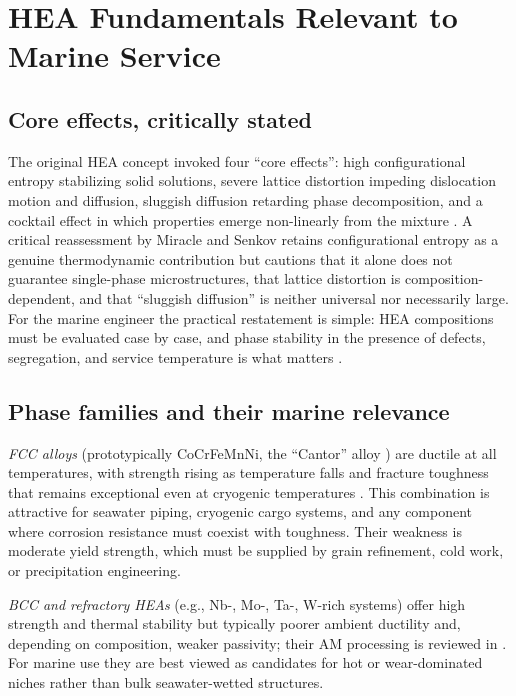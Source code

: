 \section{HEA Fundamentals Relevant to Marine Service}
\label{sec:fundamentals}

\subsection{Core effects, critically stated}

The original HEA concept invoked four ``core effects'': high configurational entropy stabilizing solid solutions, severe lattice distortion impeding dislocation motion and diffusion, sluggish diffusion retarding phase decomposition, and a cocktail effect in which properties emerge non-linearly from the mixture \cite{yeh2004,murty2019}. A critical reassessment by Miracle and Senkov \cite{miracle2017} retains configurational entropy as a genuine thermodynamic contribution but cautions that it alone does not guarantee single-phase microstructures, that lattice distortion is composition-dependent, and that ``sluggish diffusion'' is neither universal nor necessarily large. For the marine engineer the practical restatement is simple: HEA compositions must be evaluated case by case, and phase stability in the presence of defects, segregation, and service temperature is what matters \cite{george2019}.

\subsection{Phase families and their marine relevance}

\emph{FCC alloys} (prototypically CoCrFeMnNi, the ``Cantor'' alloy \cite{cantor2004}) are ductile at all temperatures, with strength rising as temperature falls \cite{otto2013} and fracture toughness that remains exceptional even at cryogenic temperatures \cite{gludovatz2014}. This combination is attractive for seawater piping, cryogenic cargo systems, and any component where corrosion resistance must coexist with toughness. Their weakness is moderate yield strength, which must be supplied by grain refinement, cold work, or precipitation engineering.

\emph{BCC and refractory HEAs} (e.g., Nb-, Mo-, Ta-, W-rich systems) offer high strength and thermal stability but typically poorer ambient ductility and, depending on composition, weaker passivity; their AM processing is reviewed in \cite{abdullah2024rhea}. For marine use they are best viewed as candidates for hot or wear-dominated niches rather than bulk seawater-wetted structures.

